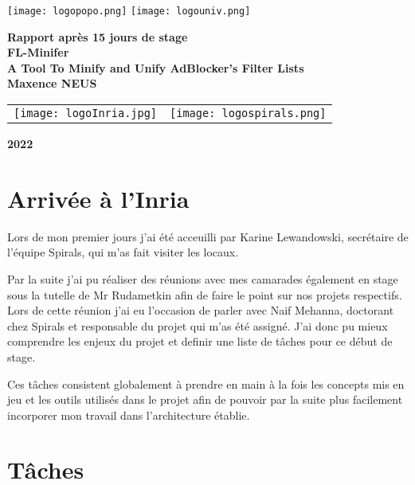 \documentclass[oneside,a4paper,12pt]{article}
\begin{document}
	\begin{titlepage}
		\texttt{[image: logopopo.png]}
		\hspace*{\fill}
		\texttt{[image: logouniv.png]}
		
		\begin{center}
			\vspace{1cm}
			\textbf{Rapport après 15 jours de stage}\\
			\vspace{1cm}
			\textbf{\LARGE FL-Minifer}\\
			\textbf{\large A Tool To Minify and Unify AdBlocker’s Filter Lists}\\
			\vspace{1cm}
			\textbf{Maxence NEUS}\\
			\vspace{1cm}
			\begin{tabular}{ c c }
				\texttt{[image: logoInria.jpg]} & \texttt{[image: logospirals.png]}\\
			\end{tabular}
			
			\vspace{\fill}
			\textbf{2022}\\
		\end{center}
	\end{titlepage}

\section{Arrivée à l'Inria}

Lors de mon premier jours j'ai été acceuilli par Karine Lewandowski, secrétaire de l'équipe Spirals, qui m'as fait visiter les locaux.

Par la suite j'ai pu réaliser des réunions avec mes camarades également en stage sous la tutelle de Mr Rudametkin afin de faire le point sur nos projets respectifs. Lors de cette réunion j'ai eu l'occasion de parler avec Naif Mehanna, doctorant chez Spirals et responsable du projet qui m'as été assigné. J'ai donc pu mieux comprendre les enjeux du projet et definir une liste de tâches pour ce début de stage.

Ces tâches consistent globalement à prendre en main à la fois les concepts mis en jeu et les outils utilisés dans le projet afin de pouvoir  par la suite plus facilement incorporer mon travail dans l'architecture établie.

\section{Tâches}
\end{document}
